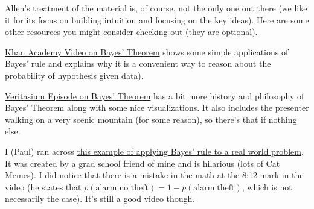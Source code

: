 \documentclass[assignment01_Solutions]{subfiles}
\begin{document}
\begin{externalresources}[(60 minutes)]
Allen's treatment of the material is, of course, not the only one out there (we like it for its focus on building intuition and focusing on the key ideas).  Here are some other resources you might consider checking out (they are optional).
\bi
\item \href{https://www.khanacademy.org/partner-content/wi-phi/wiphi-critical-thinking/wiphi-fundamentals/v/bayes-theorem}{Khan Academy Video on Bayes' Theorem} shows some simple applications of Bayes' rule and explains why it is a convenient way to reason about the probability of hypothesis given data).
\item \href{https://www.youtube.com/watch?v=R13BD8qKeTg}{Veritasium Episode on Bayes' Theorem} has a bit more history and philosophy of Bayes' Theorem along with some nice visualizations.  It also includes the presenter walking on a very scenic mountain (for some reason), so there's that if nothing else.
\item I (Paul) ran across \href{https://youtube.com/watch?v=nvqXXlz-rx0}{this example of applying Bayes' rule to a real world problem}.  It was created by a grad school friend of mine and is hilarious (lots of Cat Memes).  I did notice that there is a mistake in the math at the 8:12 mark in the video (he states that $p(\mbox{alarm} | \mbox{no theft}) = 1 - p(\mbox{alarm} | \mbox{theft})$, which is not necessarily the case).  It's still a good video though.
\ei

\end{externalresources}
\end{document}

